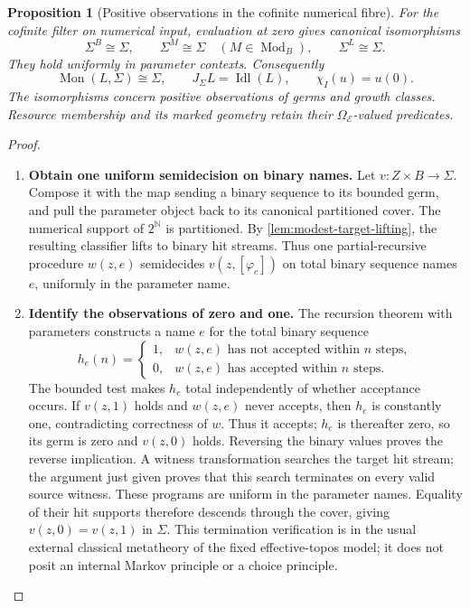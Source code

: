 \documentclass[11pt,a4paper]{article}
\numberwithin{algorithm}{section}
\numberwithin{equation}{section}
\newtheorem{proposition}[proposition]{Proposition}
\theoremstyle{definition}
\theoremstyle{remark}
\theoremstyle{plain}
\newcommand{\E}{\mathcal E}
\newcommand{\Truth}{\Omega_{\E}}
\newcommand{\N}{\mathbb N}
\newcommand{\Idl}{\operatorname{Idl}}
\newcommand{\J}{J_{\Sigma}}
\newcommand{\Mod}{\operatorname{Mod}}
\theoremstyle{definition}
\theoremstyle{plain}
\begin{document}
\begin{proposition}[Positive observations in the cofinite numerical fibre]
\label{prop:cofinite-positive-observations}
For the cofinite filter on numerical input, evaluation at zero gives
canonical isomorphisms
\[
 \Sigma^B\cong\Sigma,\qquad
 \Sigma^M\cong\Sigma\quad(M\in\Mod_B),\qquad
 \Sigma^L\cong\Sigma.
\]
They hold uniformly in parameter contexts. Consequently
\[
 \operatorname{Mon}(L,\Sigma)\cong\Sigma,\qquad
 \J L=\Idl(L),\qquad \chi_I(u)=u(0).
\]
The isomorphisms concern positive observations of germs and growth
classes. Resource membership and its marked geometry retain their
$\Truth$-valued predicates.
\end{proposition}
\begin{proof}\leavevmode
\begin{enumerate}[leftmargin=*,align=left]
\item \textbf{Obtain one uniform semidecision on binary names.}
Let $v:Z\times B\to\Sigma$. Compose it with the map sending
a binary sequence to its bounded germ, and pull the parameter
object back to its canonical partitioned cover. The numerical
support of $2^\N$ is partitioned. By
\cref{lem:modest-target-lifting}, the resulting classifier lifts
to binary hit streams. Thus one partial-recursive procedure
$w(z,e)$ semidecides $v(z,[\varphi_e])$ on total binary sequence
names $e$, uniformly in the parameter name.

\item \textbf{Identify the observations of zero and one.}
The recursion theorem with parameters
\citep[Section 2]{Terwijn2024FixedPoints} constructs a name $e$
for the total binary sequence
\[
 h_e(n)=
 \begin{cases}
 1,&w(z,e)\text{ has not accepted within }n\text{ steps},\\
 0,&w(z,e)\text{ has accepted within }n\text{ steps}.
 \end{cases}
\]
The bounded test makes $h_e$ total independently of whether
acceptance occurs. If $v(z,1)$ holds and $w(z,e)$ never accepts,
then $h_e$ is constantly one, contradicting correctness of $w$.
Thus it accepts; $h_e$ is thereafter zero, so its germ is zero
and $v(z,0)$ holds. Reversing the binary values proves the
reverse implication. A witness transformation searches the target
hit stream; the argument just given proves that this search
terminates on every valid source witness. These programs are
uniform in the parameter names. Equality of their hit supports
therefore descends through the cover, giving $v(z,0)=v(z,1)$
in $\Sigma$. This termination verification is in the usual
external classical metatheory of the fixed effective-topos model;
it does not posit an internal Markov principle or a choice principle.


\end{enumerate}
\end{proof}
\end{document}
